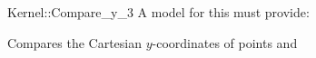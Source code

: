 \begin{ccRefFunctionObjectConcept}{Kernel::Compare_y_3}
A model for this must provide:


      {Compares the Cartesian $y$-coordinates of points  and
      }

\end{ccRefFunctionObjectConcept}
